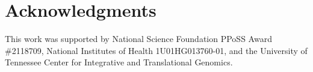 \documentclass[12pt]{article}
\begin{document}
\section*{Acknowledgments}
This work was supported by National Science Foundation PPoSS Award \#2118709, National Institutes of Health 1U01HG013760-01, and the University of Tennessee Center for Integrative and Translational Genomics.

\begingroup
\footnotesize


\endgroup
\end{document}
